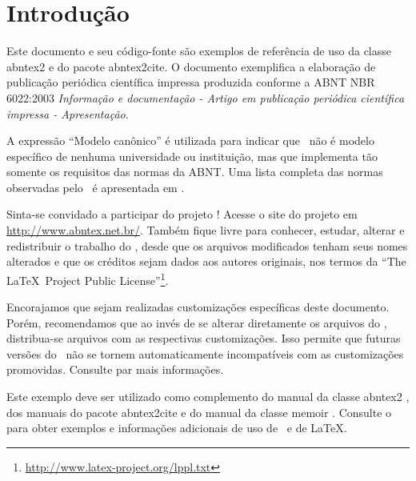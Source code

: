 \documentclass[
article,			%
11pt,				%
twoside,			%
a4paper,			%
twocolumn,          %
english,			%
brazil,				%
sumario=tradicional
]{abntex2}
\begin{document}
    
    \textual
    
    \section*{Introdução}
    
    Este documento e seu código-fonte são exemplos de referência de uso da classe \textsf{abntex2} e do pacote \textsf{abntex2cite}. O documento exemplifica a elaboração de publicação periódica científica impressa produzida conforme a ABNT NBR 6022:2003 \emph{Informação e documentação - Artigo em publicação periódica científica impressa - Apresentação}.
    
    A expressão ``Modelo canônico'' é utilizada para indicar que \abnTeX\ não é modelo específico de nenhuma universidade ou instituição, mas que implementa tão somente os requisitos das normas da ABNT. Uma lista completa das normas observadas pelo \abnTeX\ é apresentada em .
    
    Sinta-se convidado a participar do projeto \abnTeX! Acesse o site do projeto em \url{http://www.abntex.net.br/}. Também fique livre para conhecer, estudar, alterar e redistribuir o trabalho do \abnTeX, desde que os arquivos modificados tenham seus nomes alterados e que os créditos sejam dados aos autores originais, nos termos da ``The \LaTeX\ Project Public License''\footnote{\url{http://www.latex-project.org/lppl.txt}}.
    
    Encorajamos que sejam realizadas customizações específicas deste documento. Porém, recomendamos que ao invés de se alterar diretamente os arquivos do \abnTeX, distribua-se arquivos com as respectivas customizações. Isso permite que futuras versões do \abnTeX~não se tornem automaticamente incompatíveis com as customizações promovidas. Consulte  par mais informações.
    
    Este exemplo deve ser utilizado como complemento do manual da classe \textsf{abntex2} \cite{abntex2classe}, dos manuais do pacote \textsf{abntex2cite} \cite{abntex2cite,abntex2cite-alf} e do manual da classe \textsf{memoir} \cite{memoir}. Consulte o  para obter exemplos e informações adicionais de uso de \abnTeX\ e de \LaTeX.
    
\end{document}
